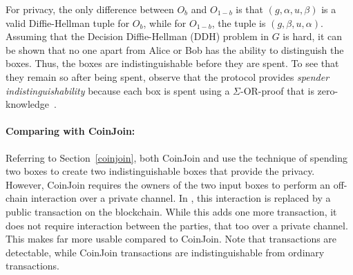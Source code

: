 \documentclass[11pt]{article}
\begin{document}
For privacy, the only difference between $O_b$ and $O_{1-b}$ is that $(g, \alpha, u, \beta)$ is a valid Diffie-Hellman tuple for $O_b$, while for $O_{1-b}$, the tuple is $(g, \beta, u, \alpha)$. Assuming that the Decision Diffie-Hellman (DDH) problem in $G$ is hard, it can be shown that no one apart from Alice or Bob has the ability to distinguish the boxes.
Thus, the boxes are indistinguishable before they are spent. To see that they remain so after being spent, observe that the protocol provides {\em spender indistinguishability} because each box is spent using a $\Sigma$-OR-proof that is zero-knowledge~\cite{Dam10}. 

\paragraph{Comparing with CoinJoin:} Referring to Section~\ref{coinjoin}, both CoinJoin and \algname use the technique of spending two boxes to create two indistinguishable boxes that provide the privacy. However, CoinJoin requires the owners of the two input boxes to perform an off-chain interaction over a private channel. In \algname, this interaction is replaced by a public transaction on the blockchain. While this adds one more transaction, it does not require interaction between the parties, that too over a private channel. This makes \algname far more usable compared to CoinJoin. Note that \algname transactions are detectable, while CoinJoin transactions are indistinguishable from ordinary transactions. 
\end{document}
